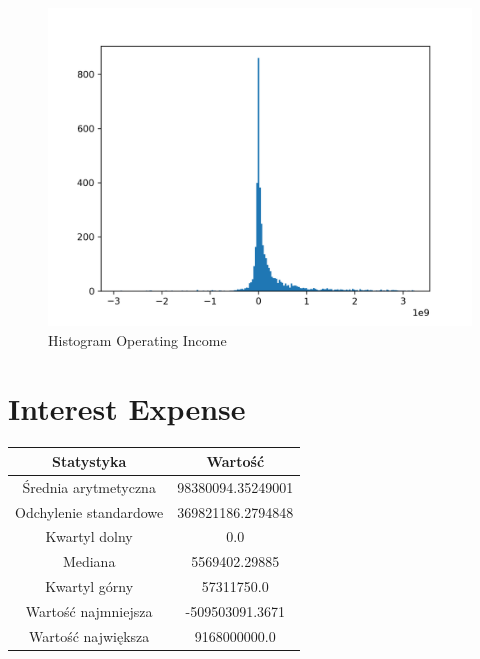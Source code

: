 \documentclass{article}
\begin{document}
\begin{figure}[h!]
    \includegraphics[width=\linewidth]{variables/Operating Income.png}
    \caption{Histogram Operating Income }
\end{figure}\section{ Interest Expense }

\begin{center}
    \begin{tabular}{|c | c|} 
    \hline
    Statystyka & Wartość \\
    \hline\hline
    Średnia arytmetyczna & 98380094.35249001 \\ 
    \hline
    Odchylenie standardowe & 369821186.2794848 \\
    \hline
    Kwartyl dolny & 0.0 \\
    \hline
    Mediana & 5569402.29885 \\
    \hline
    Kwartyl górny & 57311750.0 \\
    \hline
    Wartość najmniejsza & -509503091.3671 \\
    \hline
    Wartość największa & 9168000000.0 \\
    \hline
   \end{tabular}
\end{center}
\end{document}

